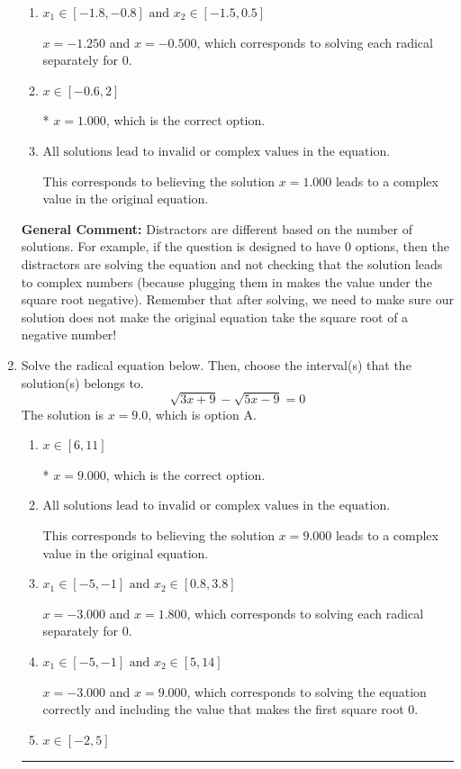 \documentclass{extbook}[14pt]
\newcommand{\litem}[1]{\item #1

\rule{\textwidth}{0.4pt}}
\begin{document}
\begin{enumerate}
{\begin{enumerate}[label=\Alph*.]
$x = -1.250$ and $x = 1.000$, which corresponds to solving the equation correctly and including the value that makes the first square root 0.
\item \( x_1 \in [-1.8, -0.8] \text{ and } x_2 \in [-1.5,0.5] \)

$x = -1.250$ and $x = -0.500$, which corresponds to solving each radical separately for 0.
\item \( x \in [-0.6,2] \)

* $x = 1.000$, which is the correct option.
\item \( \text{All solutions lead to invalid or complex values in the equation.} \)

This corresponds to believing the solution $x = 1.000$ leads to a complex value in the original equation.
\end{enumerate}

\textbf{General Comment:} Distractors are different based on the number of solutions. For example, if the question is designed to have 0 options, then the distractors are solving the equation and not checking that the solution leads to complex numbers (because plugging them in makes the value under the square root negative). Remember that after solving, we need to make sure our solution does not make the original equation take the square root of a negative number!
}
\litem{
Solve the radical equation below. Then, choose the interval(s) that the solution(s) belongs to.
\[ \sqrt{3 x + 9} - \sqrt{5 x - 9} = 0 \]The solution is \( x = 9.0 \), which is option A.\begin{enumerate}[label=\Alph*.]
\item \( x \in [6,11] \)

* $x = 9.000$, which is the correct option.
\item \( \text{All solutions lead to invalid or complex values in the equation.} \)

This corresponds to believing the solution $x = 9.000$ leads to a complex value in the original equation.
\item \( x_1 \in [-5, -1] \text{ and } x_2 \in [0.8,3.8] \)

$x = -3.000$ and $x = 1.800$, which corresponds to solving each radical separately for 0.
\item \( x_1 \in [-5, -1] \text{ and } x_2 \in [5,14] \)

$x = -3.000$ and $x = 9.000$, which corresponds to solving the equation correctly and including the value that makes the first square root 0.
\item \( x \in [-2,5] \)


\end{enumerate}}
\end{enumerate}
\end{document}
